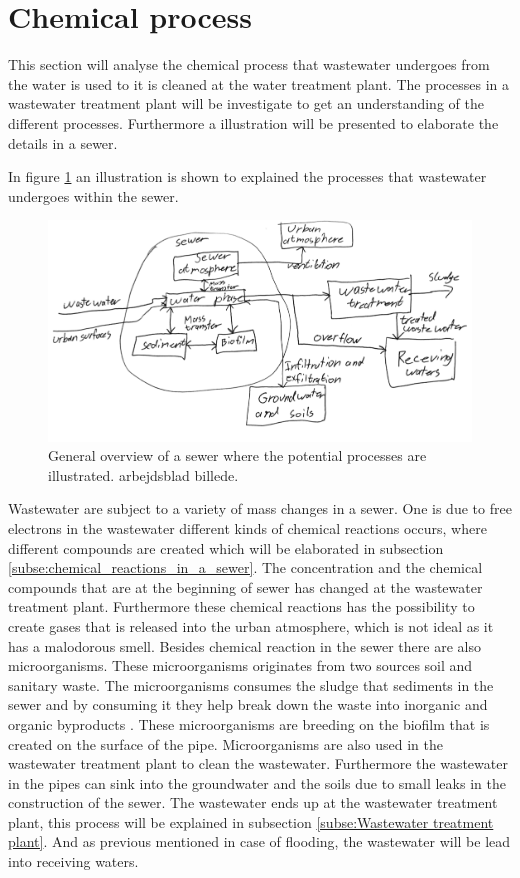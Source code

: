 \section{Chemical process}\label{se:chemical_process}
This section will analyse the chemical process that wastewater undergoes from the water is used to it is cleaned at the water treatment plant. The processes in a wastewater treatment plant will be investigate to get an understanding of the different processes. Furthermore a illustration will be presented to elaborate the details in a sewer. 

In figure \ref{fig:sewer_overview_of_the_chemical_process} an illustration is shown to explained the processes that wastewater undergoes within the sewer.
\begin{figure}[H]
\centering
\includegraphics[width=1\textwidth]{report/introduction/pictures/detailed_sewer.pdf}
\caption{General overview of a sewer where the potential processes are illustrated. arbejdsblad billede. }
\label{fig:sewer_overview_of_the_chemical_process}
\end{figure}
Wastewater are subject to a variety of mass changes in a sewer. One is due to free electrons in the wastewater different kinds of chemical reactions occurs, where different compounds are created which will be elaborated in subsection \ref{subse:chemical_reactions_in_a_sewer}. The concentration and the chemical compounds that are at the beginning of sewer has changed at the wastewater treatment plant. Furthermore these chemical reactions has the possibility to create gases that is released into the urban atmosphere, which is not ideal as it has a malodorous smell. Besides chemical reaction in the sewer there are also microorganisms. These microorganisms originates from two sources soil and sanitary waste. The microorganisms consumes the sludge that sediments in the sewer and by consuming it they help break down the waste into inorganic and organic byproducts \cite{bacteria_sewer}. These microorganisms are breeding on the biofilm that is created on the surface of the pipe. Microorganisms are also used in the wastewater treatment plant to clean the wastewater. Furthermore the wastewater in the pipes can sink into the groundwater and the soils due to small leaks in the construction of the sewer. The wastewater ends up at the wastewater treatment plant, this process will be explained in subsection \ref{subse:Wastewater treatment plant}. And as previous mentioned in case of flooding, the wastewater will be lead into receiving waters. 


